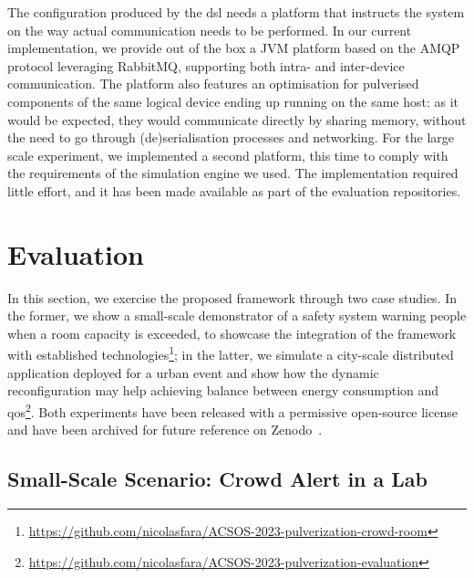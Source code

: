 \documentclass[conference]{IEEEtran}
\begin{document}
The configuration produced by the \ac{dsl} needs a platform that instructs the system on the way actual communication needs to be performed.
%
In our current implementation,
we provide out of the box a JVM platform based on the AMQP protocol leveraging RabbitMQ,
supporting both intra- and inter-device communication.
%
The platform also features an optimisation for pulverised components of the same logical device ending up running on the same host:
as it would be expected,
they would communicate directly by sharing memory,
without the need to go through (de)serialisation processes and networking.
%
For the large scale experiment,
we implemented a second platform,
this time to comply with the requirements of the simulation engine we used.
%
The implementation required little effort,
and it has been made available as part of the evaluation repositories.

\section{Evaluation}\label{sec:evaluation}

In this section,
we exercise the proposed framework through two case studies.
%
In the former,
we show a small-scale demonstrator of a safety system warning people when a room capacity is exceeded,
to showcase the integration of the framework with established technologies\footnote{
    \url{https://github.com/nicolasfara/ACSOS-2023-pulverization-crowd-room}
};
in the latter,
we simulate a city-scale distributed application deployed for a urban event
and show how the dynamic reconfiguration may help achieving balance between energy consumption and \ac{qos}\footnote{
    \url{https://github.com/nicolasfara/ACSOS-2023-pulverization-evaluation}
}.
%
Both experiments have been released with a permissive open-source license and have been archived for future reference on
Zenodo~\cite{https://doi.org/10.5281/zenodo.7933160, https://doi.org/10.5281/zenodo.7948801}.

\subsection{Small-Scale Scenario: Crowd Alert in a Lab}
\label{sec:small-scale-crowd-alert}
\end{document}
